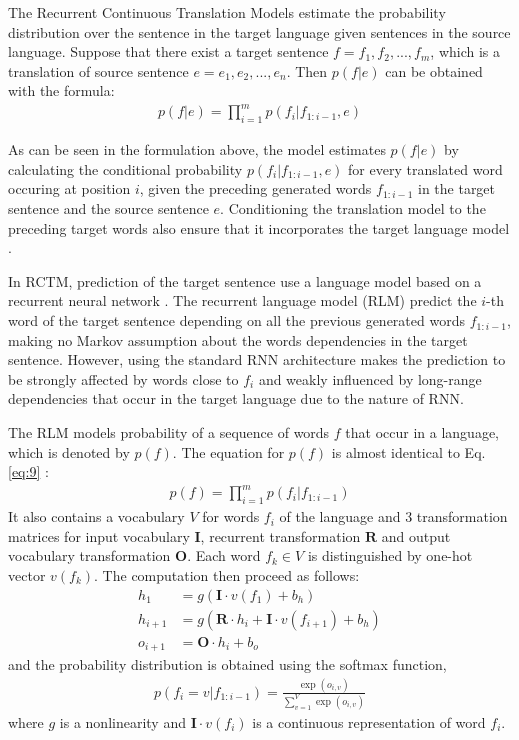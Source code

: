 \documentclass[12pt]{extarticle}
\begin{document}
The Recurrent Continuous Translation Models estimate the probability distribution over the sentence in the target language given sentences in the source language. Suppose that there exist a target sentence $f = f_{1},f_{2},...,f_{m}$, which is a translation of source sentence $e = e_{1}, e_{2},...,e_{n}$. Then $p(f|e)$ can be obtained with the formula:
\begin{align} \label{eq:9}
p(f|e) = \prod_{i=1}^{m} p(f_{i}|f_{1:i-1}, e)
\end{align}

As can be seen in the formulation above, the model estimates $p(f|e)$ by calculating the conditional probability $p(f_{i}|f_{1:i-1}, e)$ for every translated word occuring at position $i$, given the preceding generated words $f_{1:i-1}$ in the target sentence and the source sentence $e$. Conditioning the translation model to the preceding target words also ensure that it incorporates the target language model \citep{kalchbrenner-blunsom-2013-recurrent-continuous}.

In RCTM, prediction of the target sentence use a language model based on a recurrent neural network \citep{DBLP:conf/interspeech/MikolovKBCK10}. The recurrent language model (RLM) predict the $i$-th word of the target sentence depending on all the previous generated words $f_{1:i-1}$, making no Markov assumption about the words dependencies in the target sentence. However, using the standard RNN architecture makes the prediction to be strongly affected by words close to $f_{i}$ and weakly influenced by long-range dependencies that occur in the target language due to the nature of RNN.

The RLM models probability of a sequence of words $f$ that occur in a language, which is denoted by $p(f)$. The equation for $p(f)$ is almost identical to Eq. \ref{eq:9} :
\begin{align}
p(f) = \prod_{i=1}^{m} p(f_{i}|f_{1:i-1})
\end{align}
It also contains a vocabulary $V$ for words $f_{i}$ of the language and 3 transformation matrices for input vocabulary $\textbf{I}$, recurrent transformation $\textbf{R}$ and output vocabulary transformation $\textbf{O}$. Each word $f_{k} \in V$ is distinguished by one-hot vector $v(f_{k})$. The computation then proceed as follows: 
\begin{align}
h_{1} &= g(\textbf{I} \cdot v(f_{1}) + b_{h}) \\
h_{i+1} &= g(\textbf{R} \cdot h_{i} + \textbf{I} \cdot v(f_{i+1}) + b_{h}) \\
o_{i+1} &= \textbf{O} \cdot h_{i} + b_{o}
\end{align}
and the probability distribution is obtained using the softmax function, 
\begin{align}
p(f_{i} = v | f_{1:i-1}) = \frac{\exp(o_{i,v})}{\sum_{v=1}^{V}\exp(o_{i,v})}
\end{align}
where $g$ is a nonlinearity and $\textbf{I} \cdot v(f_{i})$ is a continuous representation of word $f_{i}$.
\end{document}
